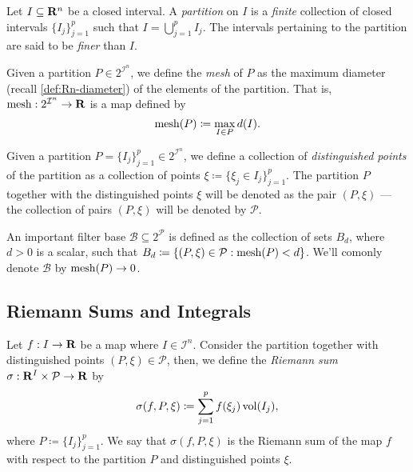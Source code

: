 \begin{definition}[Partition]
\label{def:interval-partition}
Let \(I \subseteq \mathbf{R}^n\) be a closed interval. A \emph{partition} on \(I\) is a
\emph{finite} collection of closed intervals \(\{I_{j}\}_{j=1}^p\) such that \(I
= \bigcup_{j=1}^p I_j\). The intervals pertaining to the partition are said to
be \emph{finer} than \(I\).
\end{definition}

\begin{definition}
\label{def:partition-mesh}
Given a partition \(P \in 2^{\mathcal I^n}\), we define the \emph{mesh} of \(P\)
as the maximum diameter (recall \cref{def:Rn-diameter}) of the elements of the
partition. That is, \(\operatorname{mesh}: 2^{\mathcal I^n} \to \mathbf{R}\) is a map defined by
\[
  \operatorname{mesh}(P) \coloneq \max_{I \in P} d(I).
\]
\end{definition}

\begin{definition}
\label{def:distinguished-points}
Given a partition \(P = \{I_{j}\}_{j=1}^p \in 2^{\mathcal I^n}\), we define a
collection of \emph{distinguished points} of the partition as a collection of
points \(\xi \coloneq \{\xi_j \in I_{j}\}_{j=1}^p\). The partition \(P\)
together with the distinguished points \(\xi\) will be denoted as the pair \((P,
\xi)\) --- the collection of pairs \((P, \xi)\) will be denoted by \(\mathcal
P\).
\end{definition}

An important filter base \(\mathcal B \subseteq 2^{\mathcal P}\) is
defined as the collection of sets \(B_d\), where \(d > 0\) is a scalar, such
that \(B_d \coloneq \{(P, \xi) \in \mathcal P : \operatorname{mesh}(P) < d\}\). We'll comonly
denote \(\mathcal B\) by \(\operatorname{mesh}(P) \to 0\).

\subsection{Riemann Sums and Integrals}

\begin{definition}
\label{def:riemann-sum}
Let \(f: I \to \mathbf{R}\) be a map where \(I \in \mathcal I^n\). Consider the
partition together with distinguished points \((P, \xi) \in \mathcal P\), then,
we define the \emph{Riemann sum} \(\sigma: \mathbf{R}^I \times \mathcal P \to \mathbf{R}\) by
\[
  \sigma(f, P, \xi) \coloneq \sum_{j=1}^p f(\xi_j) \operatorname{vol}(I_j),
\]
where \(P \coloneq \{I_{j}\}_{j=1}^p\). We say that \(\sigma(f, P, \xi)\) is the
Riemann sum of the map \(f\) with respect to the partition \(P\) and
distinguished points \(\xi\).
\end{definition}

